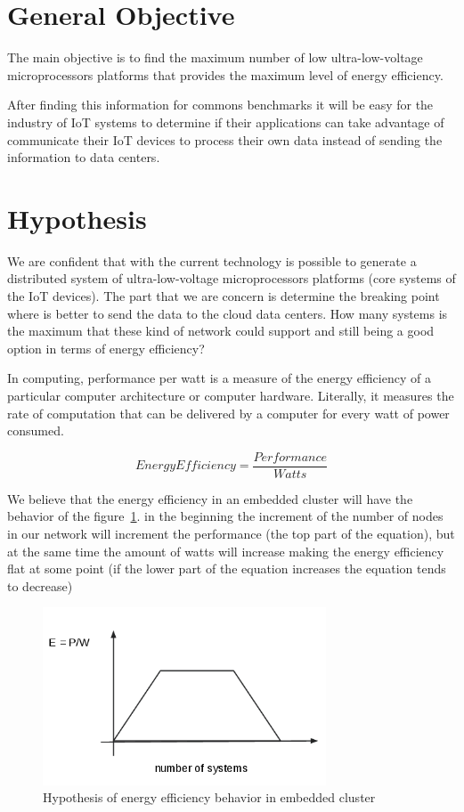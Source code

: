 \section{General Objective}
\noindent

The main objective is to find the maximum number of low ultra-low-voltage
microprocessors platforms that provides the maximum level of energy efficiency.

After finding this information for commons benchmarks it will be easy for the
industry of IoT systems to determine if their applications can take advantage
of communicate their IoT devices to process their own data instead of sending
the information to data centers.

\section{Hypothesis}
\noindent

We are confident that with the current technology is possible to generate a
distributed system of ultra-low-voltage microprocessors platforms (core
systems of the IoT devices). The part that we are concern is determine the
breaking point where is better to send the data to the cloud data centers. How
many systems is the maximum that these kind of network could support and still
being a good option in terms of energy efficiency?

In computing, performance per watt is a measure of the energy efficiency of a
particular computer architecture or computer hardware. Literally, it measures
the rate of computation that can be delivered by a computer for every watt of
power consumed.\cite{Burd} 


\begin{equation}
    Energy Efficiency = \dfrac {Performance}{Watts}
\end{equation}

We believe that the energy efficiency in an embedded cluster will have the
behavior of the  figure~\ref{fig:1.2}. in the beginning the increment of the
number of nodes in our network will increment the performance (the top part of
the equation), but at the same time the amount of watts will
increase making the energy efficiency flat at some point (if the lower part of
the equation increases the equation tends to decrease)


\begin{figure}[H]
\centering
\includegraphics[width=0.75\textwidth]{images/graph_1.png}
\caption{Hypothesis of energy efficiency behavior in embedded cluster}
\label{fig:1.2}
\end{figure}

